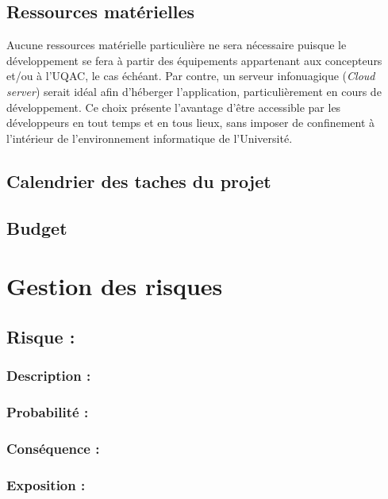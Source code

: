 \documentclass[12pt]{article}
\begin{document}
\subsection{Ressources matérielles}

Aucune ressources matérielle particulière ne sera nécessaire puisque le développement se fera à partir des équipements appartenant aux concepteurs et/ou à l'UQAC, le cas échéant.  Par contre, un serveur infonuagique (\textit{Cloud server}) serait idéal afin d'héberger l'application, particulièrement en cours de développement.  Ce choix présente l'avantage d'être accessible par les développeurs en tout temps et en tous lieux, sans imposer de confinement à l'intérieur de l'environnement informatique de l'Université.

\subsection{Calendrier des taches du projet}

\subsection{Budget}

\newpage

\section{Gestion des risques}


\subsection{Risque :}

\subsubsection*{Description :}

\subsubsection*{Probabilité :}

\subsubsection*{Conséquence :}

\subsubsection*{Exposition :}
\end{document}
